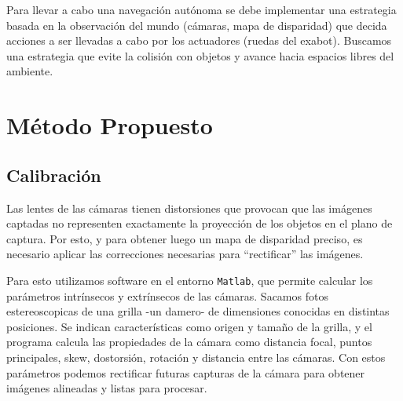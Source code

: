 \documentclass[journal,a4paper]{IEEEtran}
\begin{document}
Para llevar a cabo una navegación autónoma se debe implementar una estrategia basada en la observación del mundo (cámaras, mapa de disparidad) que decida acciones a ser llevadas a cabo por los actuadores (ruedas del exabot).
Buscamos una estrategia que evite la colisión con objetos y avance hacia espacios libres del ambiente.

\section{Método Propuesto}
\subsection{Calibración}
Las lentes de las cámaras tienen distorsiones que provocan que las imágenes captadas no representen exactamente la proyección de los objetos en el plano de captura. Por esto, y para obtener luego un mapa de disparidad preciso, es necesario aplicar las correcciones necesarias para ``rectificar'' las imágenes.

Para esto utilizamos software en el entorno \texttt{Matlab}, que permite calcular los parámetros intrínsecos y extrínsecos de las cámaras. Sacamos fotos estereoscopicas de una grilla -un damero- de dimensiones conocidas en distintas posiciones. Se indican características como origen y tamaño de la grilla, y el programa calcula las propiedades de la cámara como distancia focal, puntos principales, skew, dostorsión, rotación y distancia entre las cámaras.
Con estos parámetros podemos rectificar futuras capturas de la cámara para obtener imágenes alineadas y listas para procesar.
\end{document}
